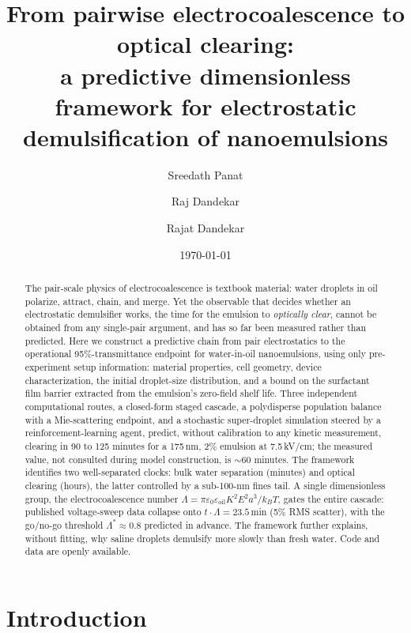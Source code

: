 \documentclass[aps,prfluids,reprint,amsmath,amssymb,superscriptaddress,longbibliography]{revtex4-2}
\begin{document}
\title{From pairwise electrocoalescence to optical clearing:\\
a predictive dimensionless framework for electrostatic demulsification of nanoemulsions}

\author{Sreedath Panat}
\author{Raj Dandekar}
\author{Rajat Dandekar}

\date{\today}

\begin{abstract}
The pair-scale physics of electrocoalescence is textbook material: water
droplets in oil polarize, attract, chain, and merge. Yet the observable that
decides whether an electrostatic demulsifier works, the time for the emulsion
to \emph{optically clear}, cannot be obtained from any single-pair argument,
and has so far been measured rather than predicted. Here we construct a
predictive chain from pair electrostatics to the operational 95\%-transmittance
endpoint for water-in-oil nanoemulsions, using only pre-experiment setup
information: material properties, cell geometry, device characterization, the
initial droplet-size distribution, and a bound on the surfactant film barrier
extracted from the emulsion's zero-field shelf life. Three independent
computational routes, a closed-form staged cascade, a polydisperse population
balance with a Mie-scattering endpoint, and a stochastic super-droplet
simulation steered by a reinforcement-learning agent, predict, without
calibration to any kinetic measurement, clearing in 90 to 125 minutes for a
175\,nm, 2\% emulsion at 7.5\,kV/cm; the measured value, not consulted
during model construction, is $\sim$60 minutes. The framework identifies two
well-separated clocks: bulk water separation (minutes) and optical clearing
(hours), the latter controlled by a sub-100-nm fines tail. A single
dimensionless group, the electrocoalescence number
$\Lambda=\pi\varepsilon_0\varepsilon_{\mathrm{oil}}K^2E^2a^3/k_BT$, gates the
entire cascade: published voltage-sweep data collapse onto
$t\cdot\Lambda=23.5$\,min (5\% RMS scatter), with the go/no-go threshold
$\Lambda^{*}\!\approx\!0.8$ predicted in advance. The framework further
explains, without fitting, why saline droplets demulsify more slowly than
fresh water. Code and data are openly available.
\end{abstract}

\maketitle

\section{Introduction}
\end{document}
